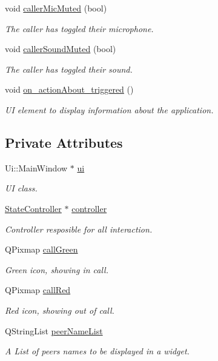 \begin{DoxyCompactItemize}
void \hyperlink{class_main_window_a4f308b9aade3aafea3c33773c17522aa}{caller\-Mic\-Muted} (bool)
\begin{DoxyCompactList}\small\item\em \-The caller has toggled their microphone. \end{DoxyCompactList}\item 
void \hyperlink{class_main_window_a73c0b86679333c83552253d798754e48}{caller\-Sound\-Muted} (bool)
\begin{DoxyCompactList}\small\item\em \-The caller has toggled their sound. \end{DoxyCompactList}\item 
void \hyperlink{class_main_window_a4f3ebda1ba39e0ef4d678b44893c9c7f}{on\-\_\-action\-About\-\_\-triggered} ()
\begin{DoxyCompactList}\small\item\em \-U\-I element to display information about the application. \end{DoxyCompactList}\end{DoxyCompactItemize}
\subsection*{\-Private \-Attributes}
\begin{DoxyCompactItemize}
\item 
\-Ui\-::\-Main\-Window $\ast$ \hyperlink{class_main_window_a35466a70ed47252a0191168126a352a5}{ui}
\begin{DoxyCompactList}\small\item\em \-U\-I class. \end{DoxyCompactList}\item 
\hyperlink{class_state_controller}{\-State\-Controller} $\ast$ \hyperlink{class_main_window_a998fca79d54f491c4ef158e03e8894d4}{controller}
\begin{DoxyCompactList}\small\item\em \-Controller resposible for all interaction. \end{DoxyCompactList}\item 
\-Q\-Pixmap \hyperlink{class_main_window_af6e038a052aefecc54322a166ad08bcf}{call\-Green}
\begin{DoxyCompactList}\small\item\em \-Green icon, showing in call. \end{DoxyCompactList}\item 
\-Q\-Pixmap \hyperlink{class_main_window_a9bd145f81a0a715e4739c3d893fb7b7b}{call\-Red}
\begin{DoxyCompactList}\small\item\em \-Red icon, showing out of call. \end{DoxyCompactList}\item 
\-Q\-String\-List \hyperlink{class_main_window_a8c245df1016600d0f111fb98c8738d6d}{peer\-Name\-List}
\begin{DoxyCompactList}\small\item\em \-A \-List of peers names to be displayed in a widget. \end{DoxyCompactList}\end{DoxyCompactItemize}



